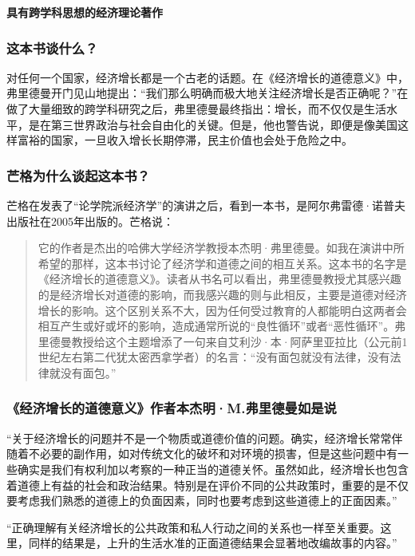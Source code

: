 \cleardoublepage
{}


\begin{BookSummaryBox}
\textbf{具有跨学科思想的经济理论著作}
\par
\end{BookSummaryBox}

\subsubsection*{这本书谈什么？}

对任何一个国家，经济增长都是一个古老的话题。在《经济增长的道德意义》中，弗里德曼开门见山地提出：“我们那么明确而极大地关注经济增长是否正确呢？”在做了大量细致的跨学科研究之后，弗里德曼最终指出：增长，而不仅仅是生活水平，是在第三世界政治与社会自由化的关键。但是，他也警告说，即便是像美国这样富裕的国家，一旦收入增长长期停滞，民主价值也会处于危险之中。
\par

\subsubsection*{芒格为什么谈起这本书？}

芒格在发表了“论学院派经济学”的演讲之后，看到一本书，是阿尔弗雷德·诺普夫出版社在2005年出版的。芒格说：
\par

\begin{quotation}
它的作者是杰出的哈佛大学经济学教授本杰明·弗里德曼。如我在演讲中所希望的那样，这本书讨论了经济学和道德之间的相互关系。这本书的名字是《经济增长的道德意义》。读者从书名可以看出，弗里德曼教授尤其感兴趣的是经济增长对道德的影响，而我感兴趣的则与此相反，主要是道德对经济增长的影响。这个区别关系不大，因为任何受过教育的人都能明白这两者会相互产生或好或坏的影响，造成通常所说的“良性循环”或者“恶性循环”。弗里德曼教授给这个主题增添了一句来自艾利沙·本·阿萨里亚拉比（公元前1世纪左右第二代犹太密西拿学者）的名言：“没有面包就没有法律，没有法律就没有面包。”
\par
\end{quotation}

\subsubsection*{《经济增长的道德意义》作者本杰明·M.弗里德曼如是说}

“关于经济增长的问题并不是一个物质或道德价值的问题。确实，经济增长常常伴随着不必要的副作用，如对传统文化的破坏和对环境的损害，但是这些问题中有一些确实是我们有权利加以考察的一种正当的道德关怀。虽然如此，经济增长也包含着道德上有益的社会和政治结果。特别是在评价不同的公共政策时，重要的是不仅要考虑我们熟悉的道德上的负面因素，同时也要考虑到这些道德上的正面因素。”
\par

“正确理解有关经济增长的公共政策和私人行动之间的关系也一样至关重要。这里，同样的结果是，上升的生活水准的正面道德结果会显著地改编故事的内容。”
\par
